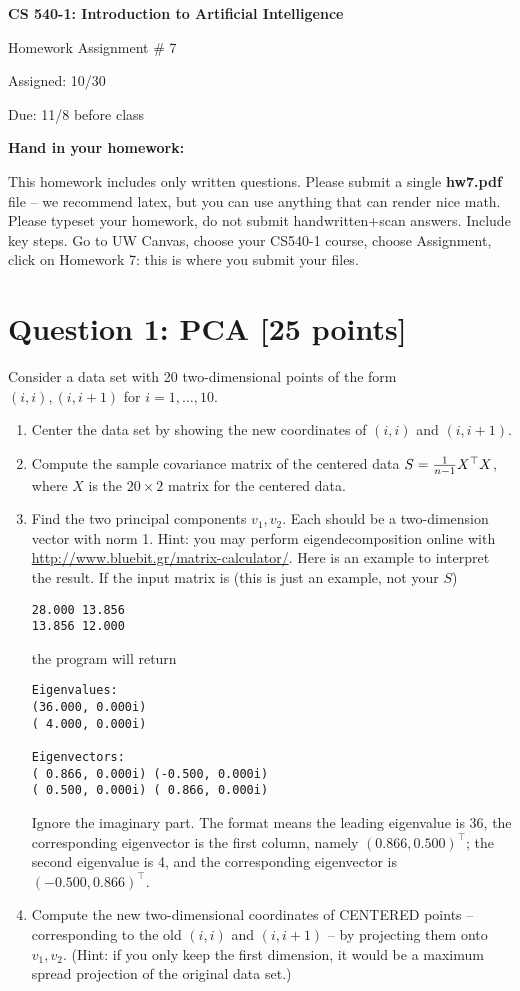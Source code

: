 \documentclass{article}
\begin{document}
\begin{center}
{\bf \large CS 540-1: Introduction to Artificial Intelligence

Homework Assignment \# 7

\vspace{0.5cm}

Assigned:  10/30 

Due:  11/8 before class} 
\end{center}

\vspace{1cm}

\begin{center}
{\bf \Large Hand in your homework:}
\end{center}

This homework includes only written questions. 
Please submit a single \textbf{hw7.pdf} file -- we recommend latex, but you can use anything that can render nice math.
Please typeset your homework, do not submit handwritten+scan answers.
Include key steps.
Go to UW Canvas, choose your CS540-1 course, choose Assignment, click on Homework 7: this is where you submit your files. 

\section*{Question 1: PCA [25 points]}
Consider a data set with 20 two-dimensional points of the form $(i, i), (i, i+1)$ for $i=1, \ldots, 10$.
\begin{enumerate}
\item Center the data set by showing the new coordinates of $(i,i)$ and $(i,i+1)$.
\item Compute the sample covariance matrix of the centered data $S={1\over n-1} X^\top X$, where $X$ is the $20\times 2$ matrix for the centered data.
\item Find the two principal components $v_1, v_2$.  Each should be a two-dimension vector with norm 1.  Hint: you may perform eigendecomposition online with \url{http://www.bluebit.gr/matrix-calculator/}.  Here is an example to interpret the result.  If the input matrix is (this is just an example, not your $S$)
\begin{verbatim}
28.000 13.856
13.856 12.000
\end{verbatim}
the program will return
\begin{verbatim}
Eigenvalues:
(36.000, 0.000i)
( 4.000, 0.000i)

Eigenvectors:
( 0.866, 0.000i) (-0.500, 0.000i)
( 0.500, 0.000i) ( 0.866, 0.000i)
\end{verbatim}
Ignore the imaginary part.  The format means the leading eigenvalue is 36, the corresponding eigenvector is the first column, namely $(0.866, 0.500)^\top$; the second eigenvalue is 4, and the corresponding eigenvector is $(-0.500, 0.866)^\top$.

\item Compute the new two-dimensional coordinates of CENTERED points -- corresponding to the old $(i,i)$ and $(i,i+1)$ -- by projecting them onto $v_1, v_2$.
(Hint: if you only keep the first dimension, it would be a maximum spread projection of the original data set.)
\end{enumerate}
\end{document}
